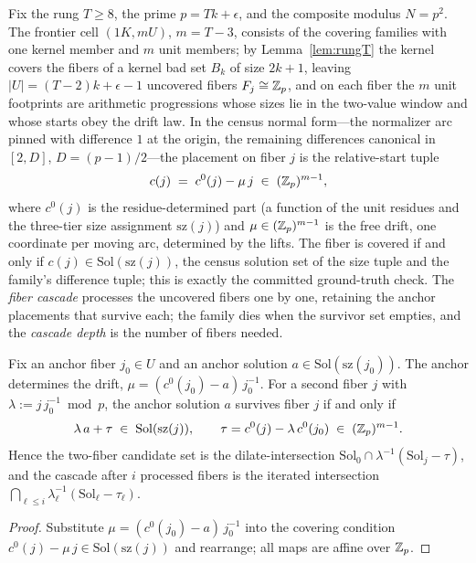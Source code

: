 Fix the rung $T\ge 8$, the prime $p=Tk+\epsilon$, and the composite
modulus $N=p^2$. The frontier cell $(1K,mU)$, $m=T-3$, consists of the
covering families with one kernel member and $m$ unit members; by
Lemma~\ref{lem:rungT} the kernel covers the fibers of a kernel bad set
$B_k$ of size $2k+1$, leaving $|U|=(T-2)k+\epsilon-1$ uncovered fibers
$F_j\cong\mathbb{Z}_p$, and on each fiber the $m$ unit footprints are arithmetic
progressions whose sizes lie in the two-value window and whose starts
obey the drift law. In the census normal form---the normalizer arc
pinned with difference $1$ at the origin, the remaining differences
canonical in $[2,D]$, $D=(p-1)/2$---the placement on fiber $j$ is the
relative-start tuple
\[
c(j)\;=\;c^0(j)-\mu\,j\;\in\;(\mathbb{Z}_p)^{m-1},
\]
where $c^0(j)$ is the residue-determined part (a function of the unit
residues and the three-tier size assignment $\mathrm{sz}(j)$) and
$\mu\in(\mathbb{Z}_p)^{m-1}$ is the free drift, one coordinate per moving arc,
determined by the lifts. The fiber is covered if and only if
$c(j)\in\mathrm{Sol}(\mathrm{sz}(j))$, the census solution set of the
size tuple and the family's difference tuple; this is exactly the
committed ground-truth check. The \emph{fiber cascade} processes the
uncovered fibers one by one, retaining the anchor placements that
survive each; the family dies when the survivor set empties, and the
\emph{cascade depth} is the number of fibers needed.

\begin{lemma}\label{lem:twofiber}
Fix an anchor fiber $j_0\in U$ and an anchor solution
$a\in\mathrm{Sol}(\mathrm{sz}(j_0))$. The anchor determines the drift,
$\mu=(c^0(j_0)-a)\,j_0^{-1}$. For a second fiber $j$ with
$\lambda:=j\,j_0^{-1}\bmod p$, the anchor solution $a$ survives fiber
$j$ if and only if
\[
\lambda\,a+\tau\;\in\;\mathrm{Sol}(\mathrm{sz}(j)),
\qquad
\tau=c^0(j)-\lambda\,c^0(j_0)\;\in\;(\mathbb{Z}_p)^{m-1}.
\]
Hence the two-fiber candidate set is the dilate-intersection
$\mathrm{Sol}_0\cap\lambda^{-1}(\mathrm{Sol}_j-\tau)$, and the cascade
after $i$ processed fibers is the iterated intersection
$\bigcap_{\ell\le i}\lambda_\ell^{-1}(\mathrm{Sol}_\ell-\tau_\ell)$.
\end{lemma}

\begin{proof}
Substitute $\mu=(c^0(j_0)-a)\,j_0^{-1}$ into the covering condition
$c^0(j)-\mu\,j\in\mathrm{Sol}(\mathrm{sz}(j))$ and rearrange; all maps
are affine over $\mathbb{Z}_p$.
\end{proof}

